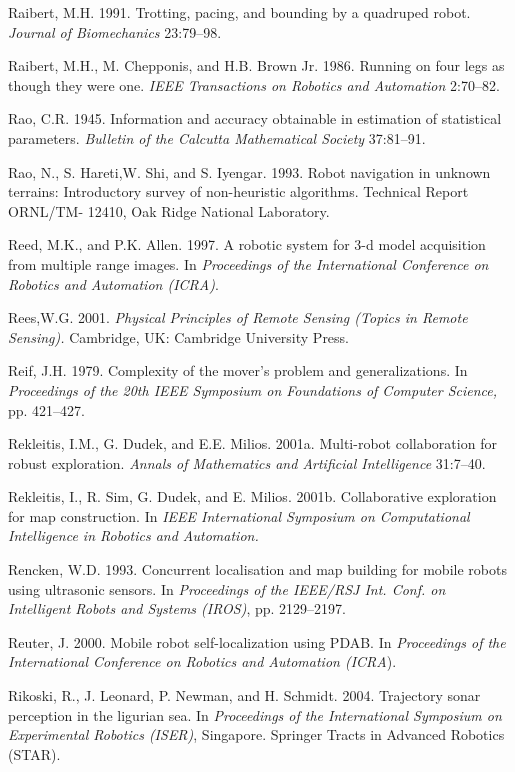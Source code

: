 \documentclass[10pt,a4paper]{article}
\begin{document}
Raibert, M.H. 1991. Trotting, pacing, and bounding by a quadruped robot. \textit{Journal of
Biomechanics} 23:79–98.

Raibert, M.H., M. Chepponis, and H.B. Brown Jr. 1986. Running on four legs as
though they were one. \textit{IEEE Transactions on Robotics and Automation} 2:70–82.

Rao, C.R. 1945. Information and accuracy obtainable in estimation of statistical parameters.
\textit{Bulletin of the Calcutta Mathematical Society }37:81–91.

Rao, N., S. Hareti,W. Shi, and S. Iyengar. 1993. Robot navigation in unknown terrains:
Introductory survey of non-heuristic algorithms. Technical Report ORNL/TM-
12410, Oak Ridge National Laboratory.

Reed, M.K., and P.K. Allen. 1997. A robotic system for 3-d model acquisition from
multiple range images. In \textit{Proceedings of the International Conference on Robotics and
Automation (ICRA)}.

Rees,W.G. 2001. \textit{Physical Principles of Remote Sensing (Topics in Remote Sensing).} Cambridge,
UK: Cambridge University Press.

Reif, J.H. 1979. Complexity of the mover’s problem and generalizations. In \textit{Proceedings
of the 20th IEEE Symposium on Foundations of Computer Science,} pp. 421–427.

Rekleitis, I.M., G. Dudek, and E.E. Milios. 2001a. Multi-robot collaboration for robust
exploration. \textit{Annals of Mathematics and Artificial Intelligence} 31:7–40.

Rekleitis, I., R. Sim, G. Dudek, and E. Milios. 2001b. Collaborative exploration for
map construction. In \textit{IEEE International Symposium on Computational Intelligence in
Robotics and Automation.}

Rencken, W.D. 1993. Concurrent localisation and map building for mobile robots
using ultrasonic sensors. In \textit{Proceedings of the IEEE/RSJ Int. Conf. on Intelligent Robots
and Systems (IROS)}, pp. 2129–2197.

Reuter, J. 2000. Mobile robot self-localization using PDAB. In \textit{Proceedings of the International
Conference on Robotics and Automation (ICRA}).

Rikoski, R., J. Leonard, P. Newman, and H. Schmidt. 2004. Trajectory sonar perception
in the ligurian sea. In \textit{Proceedings of the International Symposium on Experimental
Robotics (ISER)}, Singapore. Springer Tracts in Advanced Robotics (STAR).
\end{document}
